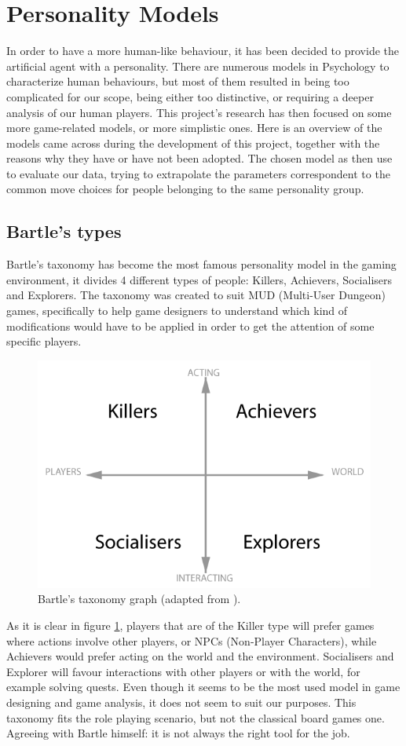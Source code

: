 \section{Personality Models}\label{sec:pers}
In order to have a more human-like behaviour, it has been decided to provide the artificial agent with a personality. There are numerous models in Psychology to characterize human behaviours, but most of them resulted in being too complicated for our scope, being either too distinctive, or requiring a deeper analysis of our human players. This project's research has then focused on some more game-related models, or more simplistic ones. 
Here is an overview of the models came across during the development of this project, together with the reasons why they have or have not been adopted. The chosen model as then use to evaluate our data, trying to extrapolate the parameters correspondent to the common move choices for people belonging to the same personality group.
\subsection{Bartle's types}
Bartle's taxonomy has become the most famous personality model in the gaming environment, it divides 4 different types of people: Killers, Achievers, Socialisers and Explorers\cite{bartle1996hearts}.
The taxonomy was created to suit MUD (Multi-User Dungeon) games, specifically to help game designers to understand which kind of modifications would have to be applied in order to get the attention of some specific players.
\begin{figure}[ht]
    \centering{}
    \includegraphics[scale=0.3]{figure/bartle.png}
    \caption{Bartle's taxonomy graph (adapted from \cite{bartle1996hearts}).}
    \label{fig:bartle}
\end{figure}
As it is clear in figure \ref{fig:bartle}, players that are of the Killer type will prefer games where actions involve other players, or NPCs (Non-Player Characters), while Achievers would prefer acting on the world and the environment. Socialisers and Explorer will favour interactions with other players or with the world, for example solving quests.
Even though it seems to be the most used model in game designing and game analysis, it does not seem to suit our purposes. This taxonomy fits the role playing scenario, but not the classical board games one. 
Agreeing with Bartle himself: it is not always the right tool for the job\cite{bartleyoutube}.
